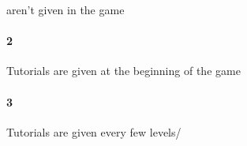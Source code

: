  aren't given in the game\paragraph{2}Tutorials are given at the beginning of the game\paragraph{3}Tutorials are given every few levels/